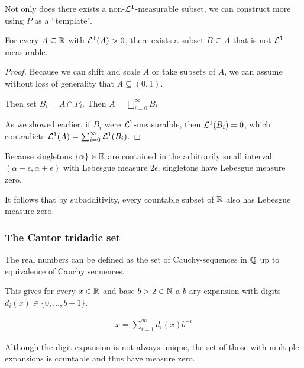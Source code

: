 Not only does there exists a non-$\mathcal{L}^{1}$-measurable subset, we can construct more using $P$ as a ``template''.

\begin{prop}[]
  For every $A \subseteq \mathbb{R}$ with $\mathcal{L}^{1}(A) > 0$, there exists a subset $B \subseteq A$ that is not $\mathcal{L}^{1}$-measurable.
\end{prop}
\begin{proof}
  Because we can shift and scale $A$ or take subsets of $A$, we can assume without loss of generality that $A \subseteq (0,1)$.

  Then set $B_i = A \cap P_i$. Then $A = \bigsqcup_{i=0}^{\infty}B_i$

  As we showed earlier, if $B_i$ were $\mathcal{L}^{1}$-measuralble, then $\mathcal{L}^{1}(B_i) = 0$, which contradicts $\mathcal{L}^{1}(A) = \sum_{i=0}^{\infty} \mathcal{L}^{1}(B_i)$.
\end{proof}

\begin{rem}[]
  Because singletons $\{\alpha\} \in \mathbb{R}$ are contained in the arbitrarily small interval $(\alpha - \epsilon, \alpha + \epsilon)$ with Lebesgue measure $2 \epsilon$,
  singletons have Lebesgue measure zero.

  It follows that by subadditivity, every countable subset of $\mathbb{R}$ also has Lebesgue measure zero.
\end{rem}



\subsubsection*{The Cantor tridadic set}

The real numbers can be defined as the set of Cauchy-sequences in $\mathbb{Q}$ up to equivalence of Cauchy sequences.

This gives for every $x \in \mathbb{R}$ and base $b > 2 \in \mathbb{N}$ a $b$-ary expansion with digits $d_i(x) \in \{0,\ldots,b-1\}$.

\begin{align*}
  x = \sum_{i=1}^{\infty}d_i(x) b^{-i}
\end{align*}

Although the digit expansion is not always unique, the set of those with multiple expansions is countable and thus have measure zero.

